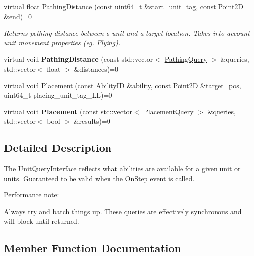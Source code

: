 \begin{DoxyCompactItemize}
virtual float \hyperlink{classsc2_1_1_unit_query_interface_a51f4e090257661d79381070f60b83af0}{Pathing\+Distance} (const uint64\+\_\+t \&start\+\_\+unit\+\_\+tag, const \hyperlink{structsc2_1_1_point2_d}{Point2D} \&end)=0
\begin{DoxyCompactList}\small\item\em Returns pathing distance between a unit and a target location. Takes into account unit movement properties (eg. Flying). \end{DoxyCompactList}\item 
\mbox{\label{classsc2_1_1_unit_query_interface_a8f6ebe4857fb19c9ac578f69ff9cc7f7}} 
virtual void {\bfseries Pathing\+Distance} (const std\+::vector$<$ \hyperlink{structsc2_1_1_unit_query_interface_1_1_pathing_query}{Pathing\+Query} $>$ \&queries, std\+::vector$<$ float $>$ \&distances)=0
\item 
virtual void \hyperlink{classsc2_1_1_unit_query_interface_ad6579937a566b41e29c67a3443aafa4d}{Placement} (const \hyperlink{classsc2_1_1_s_c2_type}{Ability\+ID} \&ability, const \hyperlink{structsc2_1_1_point2_d}{Point2D} \&target\+\_\+pos, uint64\+\_\+t placing\+\_\+unit\+\_\+tag\+\_\+L\+L)=0
\item 
\mbox{\label{classsc2_1_1_unit_query_interface_a48dd3a4cdb8f30bdebf6ca8927273fbf}} 
virtual void {\bfseries Placement} (const std\+::vector$<$ \hyperlink{structsc2_1_1_unit_query_interface_1_1_placement_query}{Placement\+Query} $>$ \&queries, std\+::vector$<$ bool $>$ \&results)=0
\end{DoxyCompactItemize}


\subsection{Detailed Description}
The \hyperlink{classsc2_1_1_unit_query_interface}{Unit\+Query\+Interface} reflects what abilities are available for a given unit or units. Guaranteed to be valid when the On\+Step event is called.

Performance note\+:
\begin{DoxyItemize}
\item Always try and batch things up. These queries are effectively synchronous and will block until returned. 
\end{DoxyItemize}

\subsection{Member Function Documentation}
\mbox{\label{classsc2_1_1_unit_query_interface_ad6579937a566b41e29c67a3443aafa4d}} 
